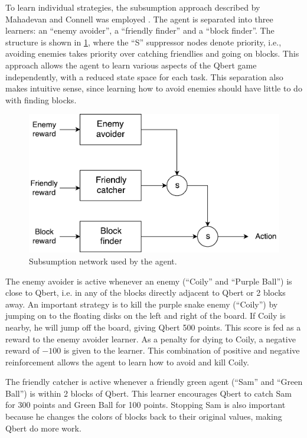 \documentclass[a4paper,titlepage]{article}
\begin{document}
	To learn individual strategies, the subsumption approach described by Mahadevan and Connell was employed \cite{mahadevan}. The agent is separated into three learners: an ``enemy avoider'', a ``friendly finder'' and a ``block finder''. The structure is shown in \cref{fig:subsumption}, where the ``S'' suppressor nodes denote priority, i.e., avoiding enemies takes priority over catching friendlies and going on blocks. This approach allows the agent to learn various aspects of the Qbert game independently, with a reduced state space for each task. This separation also makes intuitive sense, since learning how to avoid enemies should have little to do with finding blocks.
	
	\begin{figure}[!htb]
		\centering
		\includegraphics[width=\columnwidth]{plots/subsumption.pdf}
		\caption
		{Subsumption network used by the agent.}
		\label{fig:subsumption}
	\end{figure}

	The enemy avoider is active whenever an enemy (``Coily'' and ``Purple Ball'') is close to Qbert, i.e. in any of the blocks directly adjacent to Qbert or 2 blocks away. An important strategy is to kill the purple snake enemy (``Coily'') by jumping on to the floating disks on the left and right of the board. If Coily is nearby, he will jump off the board, giving Qbert 500 points. This score is fed as a reward to the enemy avoider learner. As a penalty for dying to Coily, a negative reward of $-100$ is given to the learner. This combination of positive and negative reinforcement allows the agent to learn how to avoid and kill Coily.
	
	The friendly catcher is active whenever a friendly green agent (``Sam'' and ``Green Ball'') is within 2 blocks of Qbert. This learner encourages Qbert to catch Sam for 300 points and Green Ball for 100 points. Stopping Sam is also important because he changes the colors of blocks back to their original values, making Qbert do more work.
	
\end{document}
